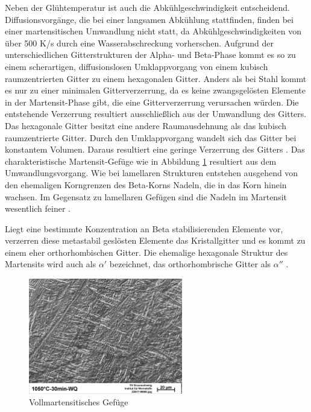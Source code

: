 \documentclass[a4paper, 11pt]{tubsreprt}
\begin{document}
Neben der Glühtemperatur ist auch die Abkühlgeschwindigkeit entscheidend. Diffusionsvorgänge, die bei einer langsamen Abkühlung stattfinden, finden bei einer martensitischen Umwandlung nicht statt, da Abkühlgeschwindigkeiten von über 500 K/s durch eine Wasserabschreckung vorherschen. Aufgrund der unterschiedlichen Gitterstrukturen der Alpha- und Beta-Phase kommt es so zu einem scherartigen, diffusionslosen Umklappvorgang von einem kubisch raumzentrierten Gitter zu einem hexagonalen Gitter. Anders als bei Stahl kommt es nur zu einer minimalen Gitterverzerrung, da es keine zwangsgelösten Elemente in der Martensit-Phase gibt, die eine Gitterverzerrung verursachen würden. Die entstehende Verzerrung resultiert ausschließlich aus der Umwandlung des Gitters. Das hexagonale Gitter besitzt eine andere Raumausdehnung als das kubisch raumzentrierte Gitter. Durch den Umklappvorgang wandelt sich das Gitter bei konstantem Volumen. Daraus resultiert eine geringe Verzerrung des Gitters \cite{Luetjering2007}. Das charakteristische Martensit-Gefüge wie in Abbildung \ref{vollmartensit} resultiert aus dem Umwandlungsvorgang. Wie bei lamellaren Strukturen entstehen ausgehend von den ehemaligen Korngrenzen des Beta-Korns Nadeln, die in das Korn hinein wachsen. Im Gegensatz zu lamellaren Gefügen sind die Nadeln im Martensit wesentlich feiner \cite{Luetjering2007}.

Liegt eine bestimmte Konzentration an Beta stabilisierenden Elemente vor, verzerren diese metastabil geslösten Elemente das Kristallgitter und es kommt zu einem eher orthorhombischen Gitter. Die ehemalige hexagonale Struktur des Martensits wird auch als $\alpha'$ bezeichnet, das orthorhombrische Gitter als $\alpha''$ \cite{Luetjering2007}. 

\begin{figure}
\centering
\includegraphics[width=0.6\textwidth]{Bilder/Vollmartensit.jpg}
\caption{Vollmartensitisches Gefüge}
\label{vollmartensit}
\end{figure}
\newpage
\end{document}
